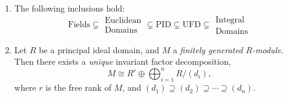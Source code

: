 \documentclass{article}
\begin{document}
\begin{enumerate}[resume = algebra]
		\item The following inclusions hold: 
		\begin{equation*}
			\text{Fields} \subsetneq \substack{\displaystyle \text{Euclidean} \\ \displaystyle \text{Domains}} \subsetneq \text{PID} \subsetneq \text{UFD} \subsetneq \substack{\displaystyle \text{Integral} \\ \displaystyle \text{Domains}}
		\end{equation*}
		\item Let $R$ be a principal ideal domain, and $M$ a \textit{finitely generated $R$-module}. Then there exists a \textit{unique} invariant factor decomposition, 
		\begin{equation*}
			M \cong R^{r} \oplus \bigoplus_{i = 1}^{n}R/(d_i), 
		\end{equation*} 
		where $r$ is the free rank of $M$, and $(d_{1}) \supseteq (d_2) \supseteq \dotsm \supseteq (d_n)$. 
	\end{enumerate}
\end{document}
